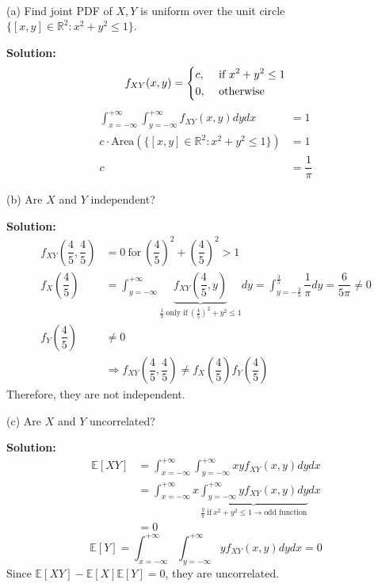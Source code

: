 \begin{eg}~ 

    (a) Find joint PDF of \(X, Y\) is uniform over the unit circle \(\{[x, y] \in \mathbb{R}^2 : x^2 + y^2 \leq 1\}\).

    \textbf{Solution:}
    \[
        f_{XY}(x, y) = \begin{dcases}
            c , &\text{ if } x^2 + y^2 \leq 1 \\
            0 , &\text{ otherwise} 
        \end{dcases} 
    \]
    \[
    \begin{aligned}
        \int_{x = -\infty}^{+\infty} \int_{y = -\infty}^{+\infty} f_{XY}(x, y) dy dx &= 1 \\
        c \cdot \text{Area}(\{[x, y] \in \mathbb{R}^2 : x^2 + y^2 \leq 1\}) &= 1 \\ 
        c &= \dfrac{1}{\pi}
    \end{aligned}
    \]

    (b) Are \(X\) and \(Y\) independent?

    \textbf{Solution:}
    \[
    \begin{aligned}
        f_{XY}(\dfrac{4}{5}, \dfrac{4}{5}) &= 0\ \text{for}\ (\dfrac{4}{5})^2 + (\dfrac{4}{5})^2 > 1 \\
        f_X(\dfrac{4}{5}) &= \int_{y = -\infty}^{+\infty}  \underbrace{f_{XY}(\dfrac{4}{5}, y)}_{\frac{1}{\pi}\ \text{only if}\ (\frac{4}{5})^2 + y^2 \leq 1} dy = \int_{y = -\frac{3}{5}}^{\frac{3}{5}}  \dfrac{1}{\pi} dy = \dfrac{6}{5\pi} \neq  0\\
        f_Y(\dfrac{4}{5}) &\neq 0 \\
        &\Longrightarrow f_{XY}(\dfrac{4}{5}, \dfrac{4}{5}) \neq  f_X(\dfrac{4}{5})f_Y(\dfrac{4}{5})
    \end{aligned}
    \]
    Therefore, they are not independent.

    (c) Are \(X\) and \(Y\) uncorrelated?

    \textbf{Solution:}
    \[
    \begin{aligned}
        \mathbb{E}[XY] &= \int_{x = -\infty}^{+\infty} \int_{y = -\infty}^{+\infty} xyf_{XY}(x, y) dy dx \\
        &= \int_{x = -\infty}^{+\infty} x \underbrace{\int_{y = -\infty}^{+\infty} yf_{XY}(x, y) dy}_{\frac{y}{\pi}\ \text{if}\ x^2 + y^2 \leq 1 \rightarrow \text{odd function}} dx \\
        &= 0
    \end{aligned}
    \]
    \[
        \mathbb{E}[Y] = \int_{x = -\infty}^{+\infty} \int_{y = -\infty}^{+\infty} yf_{XY}(x, y) dy dx = 0
    \]
    Since \(\mathbb{E}[XY] - \mathbb{E}[X]\mathbb{E}[Y] = 0\), they are uncorrelated. 
\end{eg}

